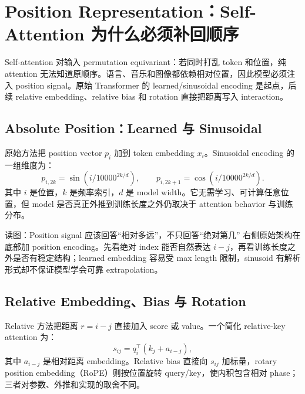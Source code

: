 \section{Position Representation：Self-Attention 为什么必须补回顺序}

Self-attention 对输入 permutation equivariant：若同时打乱 token 和位置，纯 attention 无法知道原顺序。语言、音乐和图像都依赖相对位置，因此模型必须注入 position signal。原始 Transformer 的 learned/sinusoidal encoding 是起点，后续 relative embedding、relative bias 和 rotation 直接把距离写入 interaction。

\subsection{Absolute Position：Learned 与 Sinusoidal}

原始方法把 position vector $p_i$ 加到 token embedding $x_i$。Sinusoidal encoding 的一组维度为：
\[
p_{i,2k}=\sin\!\left(i/10000^{2k/d}\right),\qquad
p_{i,2k+1}=\cos\!\left(i/10000^{2k/d}\right).
\]
其中 $i$ 是位置，$k$ 是频率索引，$d$ 是 model width。它无需学习、可计算任意位置，但 model 是否真正外推到训练长度之外仍取决于 attention behavior 与训练分布。


\begin{knowledgebox}{读图：Position signal 应该回答“相对多远”，不只回答“绝对第几”}
右侧原始架构在底部加 position encoding。先看绝对 index 能否自然表达 $i-j$，再看训练长度之外是否有稳定结构；learned embedding 容易受 max length 限制，sinusoid 有解析形式却不保证模型学会可靠 extrapolation。
\end{knowledgebox}


\subsection{Relative Embedding、Bias 与 Rotation}

Relative 方法把距离 $r=i-j$ 直接加入 score 或 value。一个简化 relative-key attention 为：
\[
s_{ij}=q_i^\top(k_j+a_{i-j}),
\]
其中 $a_{i-j}$ 是相对距离 embedding。Relative bias 直接向 $s_{ij}$ 加标量，rotary position embedding（RoPE）则按位置旋转 query/key，使内积包含相对 phase；三者对参数、外推和实现的取舍不同。

